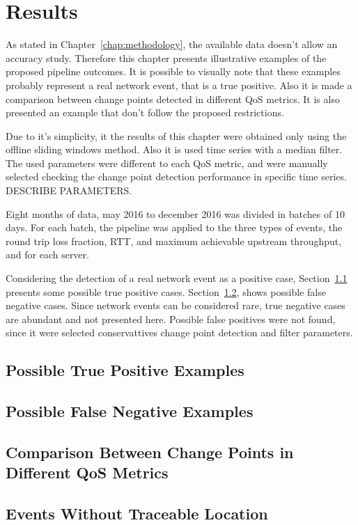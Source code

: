 \chapter{Results}
\label{chap:results}

As stated in Chapter~\ref{chap:methodology}, the available data doesn't allow
an accuracy study. Therefore this chapter presents illustrative examples of the
proposed pipeline outcomes. It is possible to visually note that these examples
probably represent a real network event, that is a true positive.
Also it is made a comparison between
change points detected in different QoS metrics. It is also presented an
example that don't follow the proposed restrictions.

Due to it's simplicity, it the results of this chapter were obtained only using
the offline sliding windows method. Also it is used time series with a median
filter.
The used parameters were different to each
QoS metric, and were manually selected checking the change point detection
performance in specific time series. DESCRIBE PARAMETERS.

Eight months of data, may 2016 to december 2016 was divided in batches of
10 days.
For each batch, the pipeline was applied to the three types of events, the
round trip loss fraction, RTT, and maximum achievable upstream throughput, and
for each server.

Considering the detection of a real network event as a positive case,
Section~\ref{sec:possible_true_positive_examples} presents some possible true
positive cases. Section~\ref{sec:possible_false_negative_examples}, shows
possible false negative cases. Since network events can be considered rare,
true negative cases are abundant and not presented here. Possible false
positives were not found, since it were selected conservattives change point
detection and filter parameters.

\section{Possible True Positive Examples}
\label{sec:possible_true_positive_examples}

\section{Possible False Negative Examples}
\label{sec:possible_false_negative_examples}

\section{Comparison Between Change Points in Different QoS Metrics}
\label{sec:comparison_between_change_points_in_different_qos_metrics}

\section{Events Without Traceable Location}
\label{sec:events_without_traceable_location}
